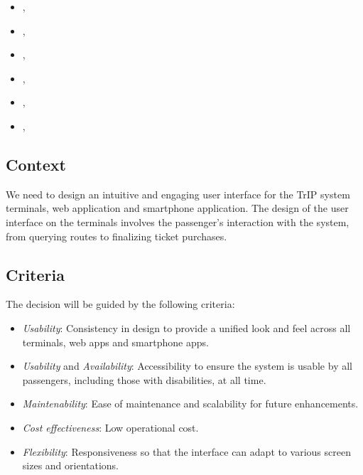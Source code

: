 \begin{itemize}
    \item \userStorySixteen,
    \item \userStorySeven,
    \item \userStoryFourteen,
    \item \userStoryNine,
    \item \userStoryTwentyNine,
    \item \userStoryThirty,
\end{itemize}

\subsection*{Context}
We need to design an intuitive and engaging user interface for the TrIP system terminals, web application and smartphone application.
The design of the user interface on the terminals involves the passenger's interaction with the system, from querying routes to finalizing ticket purchases.

\subsection*{Criteria}
The decision will be guided by the following criteria:
\begin{itemize}
    \item \textit{Usability}: Consistency in design to provide a unified look and feel across all terminals, web apps and smartphone apps.
    \item \textit{Usability} and \textit{Availability}: Accessibility to ensure the system is usable by all passengers, including those with disabilities, at all time.
    \item \textit{Maintenability}: Ease of maintenance and scalability for future enhancements.
    \item \textit{Cost effectiveness}: Low operational cost.
    \item \textit{Flexibility}: Responsiveness so that the interface can adapt to various screen sizes and orientations.
\end{itemize}

